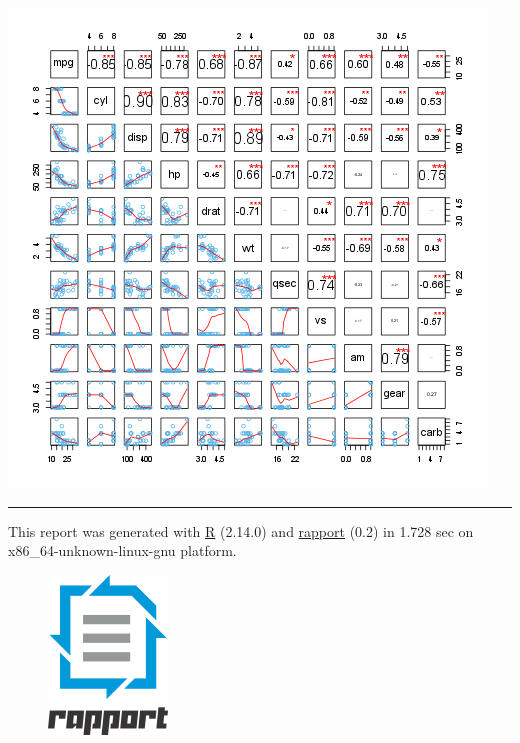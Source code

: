 \documentclass[]{article}
\makeatletter
\def\maxwidth{\ifdim\Gin@nat@width>\linewidth\linewidth
\else\Gin@nat@width\fi}
\let\Oldincludegraphics\includegraphics
\renewcommand{\includegraphics}[1]{\Oldincludegraphics[width=\maxwidth]{#1}}
\makeatother
\begin{document}
\href{82a0f381195bb4f50da3c943e264add1-hires.png}{\includegraphics{82a0f381195bb4f50da3c943e264add1.png}}

\begin{center}\rule{3in}{0.4pt}\end{center}

This report was generated with \href{http://www.r-project.org/}{R}
(2.14.0) and \href{http://al3xa.github.com/rapport/}{rapport} (0.2) in
1.728 sec on x86\_64-unknown-linux-gnu platform.

\begin{figure}[htbp]
\centering
\includegraphics{images/logo.png}
\caption{}
\end{figure}
\end{document}
